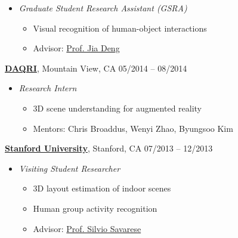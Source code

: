 \documentclass[10pt]{article}
\newenvironment{innerlist}[1][\enskip\textbullet]%
        {\begin{itemize}[#1,leftmargin=*,parsep=0pt,itemsep=0pt,topsep=0pt,partopsep=0pt]}
        {\end{itemize}}
\begin{document}
\begin{innerlist}
\item[] \emph{Graduate Student Research Assistant (GSRA)} \\
    \vspace{-.15in}
    \begin{innerlist}
    \item Visual recognition of human-object interactions
    \item Advisor: \href{http://web.eecs.umich.edu/~jiadeng/}{Prof. Jia Deng}
    \end{innerlist}
\end{innerlist}
\vspace{.1in}
\href{http://daqri.com/}{\textbf{DAQRI}}, Mountain View, CA \hfill {05/2014 -- 08/2014} \\
\vspace{-.15in}
\begin{innerlist}
\item[] \emph{Research Intern} \\
    \vspace{-.15in}
    \begin{innerlist}
    \item 3D scene understanding for augmented reality
    \item Mentors: Chris Broaddus, Wenyi Zhao, Byungsoo Kim
    \end{innerlist}
\end{innerlist}
\vspace{.1in}
\href{http://www.stanford.edu}{\textbf{Stanford University}}, Stanford, CA \hfill {07/2013 -- 12/2013} \\
\vspace{-.15in}
\begin{innerlist}
\item[] \emph{Visiting Student Researcher} \\
    \vspace{-.15in}
    \begin{innerlist}
    \item 3D layout estimation of indoor scenes
    \item Human group activity recognition
    \item Advisor: \href{http://cvgl.stanford.edu/silvio/}{Prof. Silvio Savarese}
    \end{innerlist}
\end{innerlist}
\end{document}
